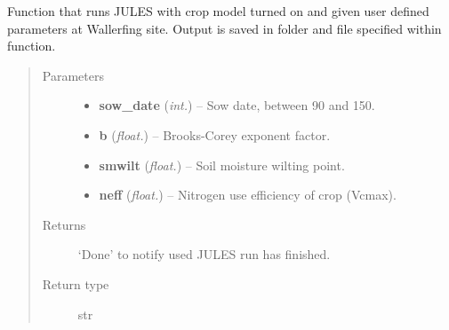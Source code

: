 \documentclass[letterpaper,10pt,english]{sphinxmanual}
\begin{document}
\begin{fulllineitems}
\label{source/sentinelSimulator.jules:sentinelSimulator.jules.py_jules.crop_run}
Function that runs JULES with crop model turned on and given user defined parameters at Wallerfing site. Output is
saved in folder and file specified within function.
\begin{quote}\begin{description}
\item[{Parameters}] \leavevmode\begin{itemize}
\item {} 
\textbf{sow\_date} (\emph{int.}) -- Sow date, between 90 and 150.

\item {} 
\textbf{b} (\emph{float.}) -- Brooks-Corey exponent factor.

\item {} 
\textbf{smwilt} (\emph{float.}) -- Soil moisture wilting point.

\item {} 
\textbf{neff} (\emph{float.}) -- Nitrogen use efficiency of crop (Vcmax).

\end{itemize}

\item[{Returns}] \leavevmode
`Done' to notify used JULES run has finished.

\item[{Return type}] \leavevmode
str

\end{description}\end{quote}

\end{fulllineitems}

\end{document}
